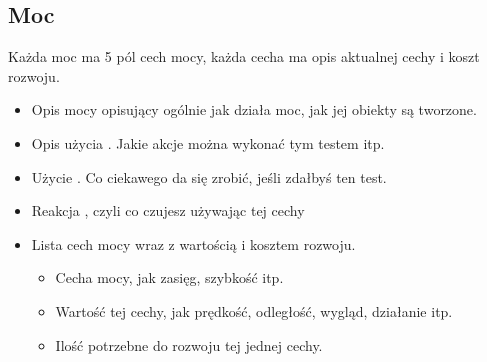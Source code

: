 \subsection{Moc}
Każda moc ma 5 pól cech mocy, każda cecha ma opis aktualnej cechy i koszt rozwoju.
\begin{itemize}
\item Opis mocy opisujący ogólnie jak działa moc, jak jej obiekty są tworzone.
\item Opis użycia \absm. Jakie akcje można wykonać tym testem itp.
\item Użycie \abdm. Co ciekawego da się zrobić, jeśli zdałbyś ten test.
\item Reakcja \abrm, czyli co czujesz używając tej cechy
\item Lista cech mocy wraz z wartością i kosztem rozwoju.
\begin{itemize}
 \item Cecha mocy, jak zasięg, szybkość itp.
 \item Wartość tej cechy, jak prędkość, odległość, wygląd, działanie itp.
 \item Ilość \xpmcn potrzebne do rozwoju tej jednej cechy.
\end{itemize}
\end{itemize}






